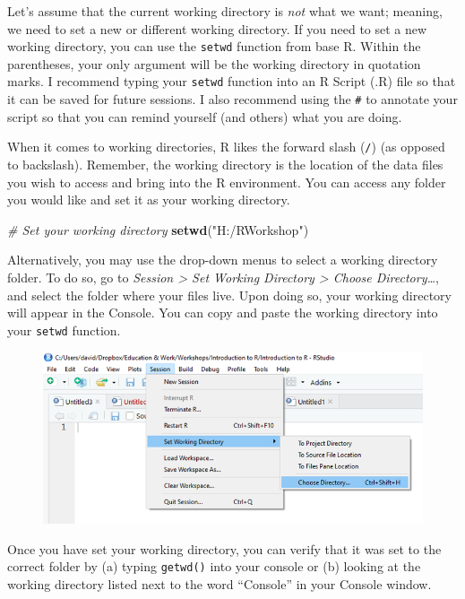 \documentclass[]{book}
\newenvironment{Shaded}{\begin{snugshade}}{\end{snugshade}}
\newcommand{\KeywordTok}[1]{\textcolor[rgb]{0.13,0.29,0.53}{\textbf{#1}}}
\newcommand{\StringTok}[1]{\textcolor[rgb]{0.31,0.60,0.02}{#1}}
\newcommand{\CommentTok}[1]{\textcolor[rgb]{0.56,0.35,0.01}{\textit{#1}}}
\newcommand{\NormalTok}[1]{#1}
\begin{document}
Let's assume that the current working directory is \emph{not} what we
want; meaning, we need to set a new or different working directory. If
you need to set a new working directory, you can use the \texttt{setwd}
function from base R. Within the parentheses, your only argument will be
the working directory in quotation marks. I recommend typing your
\texttt{setwd} function into an R Script (.R) file so that it can be
saved for future sessions. I also recommend using the \texttt{\#} to
annotate your script so that you can remind yourself (and others) what
you are doing.

When it comes to working directories, R likes the forward slash
(\texttt{/}) (as opposed to backslash). Remember, the working directory
is the location of the data files you wish to access and bring into the
R environment. You can access any folder you would like and set it as
your working directory.

\begin{Shaded}
\begin{Highlighting}[]
\CommentTok{# Set your working directory}
\KeywordTok{setwd}\NormalTok{(}\StringTok{"H:/RWorkshop"}\NormalTok{)}
\end{Highlighting}
\end{Shaded}

Alternatively, you may use the drop-down menus to select a working
directory folder. To do so, go to \emph{Session \textgreater{} Set
Working Directory \textgreater{} Choose Directory\ldots{}}, and select
the folder where your files live. Upon doing so, your working directory
will appear in the Console. You can copy and paste the working directory
into your \texttt{setwd} function.

\begin{figure}
\centering
\includegraphics{Set Working Directory.png}
\caption{}
\end{figure}

Once you have set your working directory, you can verify that it was set
to the correct folder by (a) typing \texttt{getwd()} into your console
or (b) looking at the working directory listed next to the word
``Console'' in your Console window.
\end{document}
